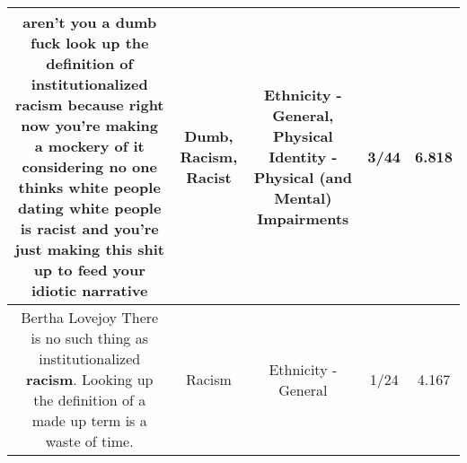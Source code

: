 \documentclass[11pt]{article}
\newlength\mylength
\begin{document}
\begin{center}
\begin{longtable}{|C{.65\mylength}|C{.30\mylength}|C{.12\mylength}|C{.12\mylength}|C{.12\mylength}|}
  \small aren't you a \textbf{dumb} fuck look up the definition of institutionalized \textbf{racism} because right now you're making a mockery of it considering no one thinks white people dating white people is \textbf{racist} and you're just making this shit up to feed your idiotic narrative\normalsize   & Dumb, Racism, Racist & Ethnicity - General, Physical Identity - Physical (and Mental) Impairments & 3/44 & 6.818 \\  \hline
  \small Bertha Lovejoy There is no such thing as institutionalized \textbf{racism}. Looking up the definition of a made up term is a waste of time.\normalsize   & Racism & Ethnicity - General & 1/24 & 4.167 \\  \hline

\end{longtable}
\end{center}
\end{document}
